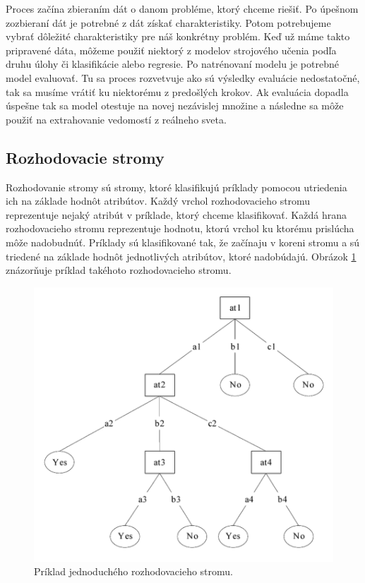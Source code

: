 Proces začína zbieraním dát o danom probléme, ktorý chceme riešiť. Po úpešnom zozbieraní dát je potrebné z dát získať charakteristiky. Potom potrebujeme vybrať dôležité charakteristiky pre náš konkrétny problém. Keď už máme takto pripravené dáta, môžeme použiť niektorý z modelov strojového učenia podľa druhu úlohy či klasifikácie alebo regresie. Po natrénovaní modelu je potrebné model evaluovať. Tu sa proces rozvetvuje ako sú výsledky evaluácie nedostatočné, tak sa musíme vrátiť ku niektorému z predošlých krokov. Ak evaluácia dopadla úspešne tak sa model otestuje na novej nezávislej množine a následne sa môže použiť na extrahovanie vedomostí z reálneho sveta.
\subsection{Rozhodovacie stromy}
Rozhodovanie stromy sú stromy, ktoré klasifikujú príklady pomocou utriedenia ich na základe hodnôt atribútov. Každý vrchol rozhodovacieho stromu reprezentuje nejaký atribút v príklade, ktorý chceme klasifikovať. Každá hrana rozhodovacieho stromu reprezentuje hodnotu, ktorú vrchol ku ktorému prislúcha môže nadobudnúť. Príklady sú klasifikované tak, že začínaju v koreni stromu a sú triedené na základe hodnôt jednotlivých atribútov, ktoré nadobúdajú. Obrázok \ref{img:decision_tree} znázorňuje príklad takéhoto rozhodovacieho stromu.
\begin{figure}[H]
	\begin{center}
		\includegraphics[scale=0.5]{img/decision_tree.png}
		\caption{Príklad jednoduchého rozhodovacieho stromu. \cite{class_review}}
		\label{img:decision_tree}
	\end{center}
\end{figure}
